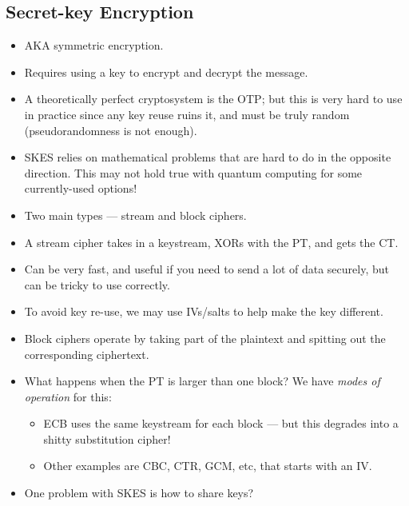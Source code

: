 \documentclass{article}
\begin{document}
\subsection{Secret-key Encryption}
\begin{itemize}
    \item AKA symmetric encryption.
    \item Requires using a key to encrypt and decrypt the message.
    \item A theoretically perfect cryptosystem is the OTP; but this is very hard to use in practice since any key reuse ruins it, and must be truly random (pseudorandomness is not enough).
    \item SKES relies on mathematical problems that are hard to do in the opposite direction.  This may not hold true with quantum computing for some currently-used options!
    \item Two main types --- stream and block ciphers.
    \item A stream cipher takes in a keystream, XORs with the PT, and gets the CT.
    \item Can be very fast, and useful if you need to send a lot of data securely, but can be tricky to use correctly.
    \item To avoid key re-use, we may use IVs/salts to help make the key different.
    \item Block ciphers operate by taking part of the plaintext and spitting out the corresponding ciphertext.
    \item What happens when the PT is larger than one block?  We have \emph{modes of operation} for this:
        \begin{itemize}
            \item ECB uses the same keystream for each block --- but this degrades into a shitty substitution cipher!
            \item Other examples are CBC, CTR, GCM, etc, that starts with an IV. 
        \end{itemize}
    \item One problem with SKES is how to share keys?
\end{itemize}
\end{document}
